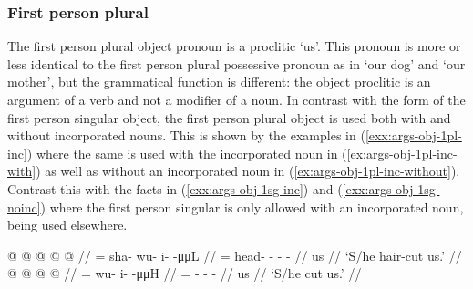 
\subsubsection{First person plural}\label{sec:args-obj-1pl}

The first person plural object pronoun is a proclitic  ‘us’. This pronoun is more or less identical to the first person plural possessive pronoun as in  ‘our dog’ and  ‘our mother’, but the grammatical function is different: the object proclitic  is an argument of a verb and not a modifier of a noun. In contrast with the  form of the first person singular object, the first person plural object  is used both with and without incorporated nouns. This is shown by the examples in (\ref{exx:args-obj-1pl-inc}) where the same  is used with the incorporated noun  in (\ref{ex:args-obj-1pl-inc-with}) as well as without an incorporated noun in (\ref{ex:args-obj-1pl-inc-without}). Contrast this with the facts in (\ref{exx:args-obj-1sg-inc}) and (\ref{exx:args-obj-1sg-noinc}) where the first person singular  is only allowed with an incorporated noun,  being used elsewhere.

\pex\label{exx:args-obj-1pl-inc}%
\a\label{ex:args-obj-1pl-inc-with}%
%
\begingl
	\gla	{} @  @ {} @ {} @ {} @ {} //
	\glb	{}= sha- wu- i-  -μμL //
	\glc	{}= head- - -  - //
	\gld	us  {} {} {} {} //
	\glft	‘S/he hair-cut us.’
		//
\endgl
\a\label{ex:args-obj-1pl-inc-without}%
%
\begingl
	\gla	{} @  @ {} @ {} @ {} //
	\glb	{}= wu- i-  -μμH //
	\glc	{}= - -  - //
	\gld	us  //
	\glft	‘S/he cut us.’
		//
\endgl
\xe

